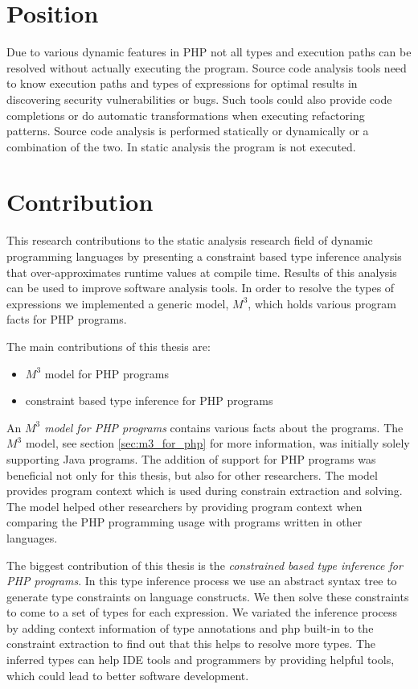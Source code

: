 \documentclass[../main.tex]{subfiles}
\begin{document}
    \section{Position}
        Due to various dynamic features in PHP not all types and execution paths can be resolved without actually executing the program.
        Source code analysis tools need to know execution paths and types of expressions for optimal results in discovering security vulnerabilities or bugs.
        Such tools could also provide code completions or do automatic transformations when executing refactoring patterns.
        Source code analysis is performed statically or dynamically or a combination of the two.
        In static analysis the program is not executed.

    \section{Contribution}        
        This research contributions to the static analysis research field of dynamic programming languages by presenting a constraint based type inference analysis that over-approximates runtime values at compile time.
        Results of this analysis can be used to improve software analysis tools.
        In order to resolve the types of expressions we implemented a generic model, $M^3$, which holds various program facts for PHP programs.
        
        The main contributions of this thesis are:
        \begin{itemize}
            \item $M^3$ model for PHP programs
            \item constraint based type inference for PHP programs
        \end{itemize}

		An \textit{$M^3$ model for PHP programs} contains various facts about the programs.
		The $M^3$ model, see section \ref{sec:m3_for_php} for more information, was initially solely supporting Java programs.
		The addition of support for PHP programs was beneficial not only for this thesis, but also for other researchers.
		The model provides program context which is used during constrain extraction and solving.
		The model helped other researchers by providing program context when comparing the PHP programming usage with programs written in other languages.

		The biggest contribution of this thesis is the \textit{constrained based type inference for PHP programs}.
		In this type inference process we use an abstract syntax tree to generate type constraints on language constructs.
		We then solve these constraints to come to a set of types for each expression.
		We variated the inference process by adding context information of type annotations and php built-in to the constraint extraction to find out that this helps to resolve more types.
		The inferred types can help IDE tools and programmers by providing helpful tools, which could lead to better software development.        
    
\end{document}
